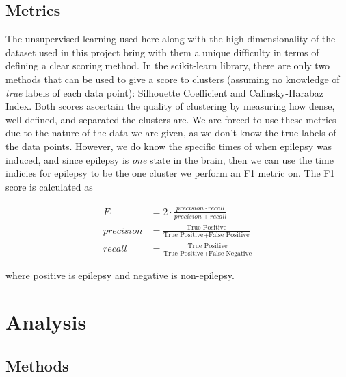 \documentclass[journal,12pt,onecolumn,draftclsnofoot]{IEEEtran}  %
\begin{document}

\subsection{Metrics}
The unsupervised learning used here along with the high dimensionality of the dataset used in this project bring with them a unique difficulty in terms of defining a clear scoring method. In the scikit-learn library, there are only two methods that can be used to give a score to clusters (assuming no knowledge of \textit{true} labels of each data point): Silhouette Coefficient and Calinsky-Harabaz Index. Both scores ascertain the quality of clustering by measuring how dense, well defined, and separated the clusters are. We are forced to use these metrics due to the nature of the data we are given, as we don't know the true labels of the data points. However, we do know the specific times of when epilepsy was induced, and since epilepsy is \textit{one} state in the brain, then we can use the time indicies for epilepsy to be the one cluster we perform an F1 metric on. The F1 score is calculated as 

\begin{align*}
	F_1 &= 2 \cdot \frac{precision \cdot recall}{precision + recall} \\
	precision &= \frac{\text{True Positive}}{\text{True Positive} + \text{False Positive}} \\
	recall &= \frac{\text{True Positive}}{\text{True Positive} + \text{False Negative}}
\end{align*}

where positive is epilepsy and negative is non-epilepsy.


\newpage
\section{Analysis}
\subsection{Methods}
\end{document}
